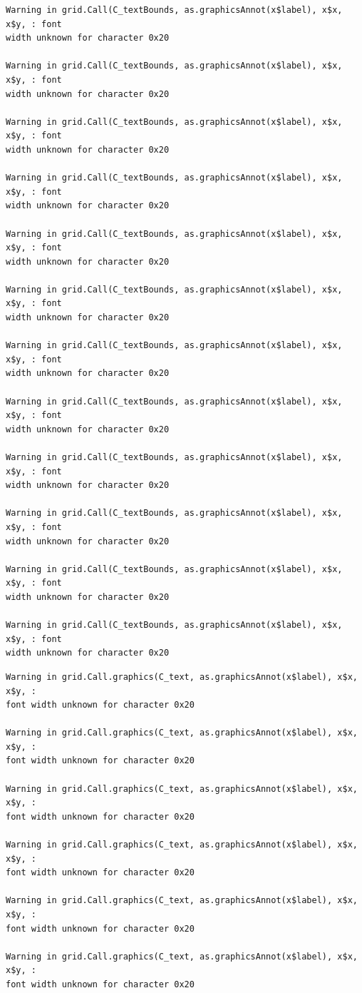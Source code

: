\documentclass[
  letterpaper,
  DIV=11,
  numbers=noendperiod,
  oneside]{scrartcl}
\begin{document}
\begin{verbatim}
Warning in grid.Call(C_textBounds, as.graphicsAnnot(x$label), x$x, x$y, : font
width unknown for character 0x20

Warning in grid.Call(C_textBounds, as.graphicsAnnot(x$label), x$x, x$y, : font
width unknown for character 0x20

Warning in grid.Call(C_textBounds, as.graphicsAnnot(x$label), x$x, x$y, : font
width unknown for character 0x20

Warning in grid.Call(C_textBounds, as.graphicsAnnot(x$label), x$x, x$y, : font
width unknown for character 0x20

Warning in grid.Call(C_textBounds, as.graphicsAnnot(x$label), x$x, x$y, : font
width unknown for character 0x20

Warning in grid.Call(C_textBounds, as.graphicsAnnot(x$label), x$x, x$y, : font
width unknown for character 0x20

Warning in grid.Call(C_textBounds, as.graphicsAnnot(x$label), x$x, x$y, : font
width unknown for character 0x20

Warning in grid.Call(C_textBounds, as.graphicsAnnot(x$label), x$x, x$y, : font
width unknown for character 0x20

Warning in grid.Call(C_textBounds, as.graphicsAnnot(x$label), x$x, x$y, : font
width unknown for character 0x20

Warning in grid.Call(C_textBounds, as.graphicsAnnot(x$label), x$x, x$y, : font
width unknown for character 0x20

Warning in grid.Call(C_textBounds, as.graphicsAnnot(x$label), x$x, x$y, : font
width unknown for character 0x20

Warning in grid.Call(C_textBounds, as.graphicsAnnot(x$label), x$x, x$y, : font
width unknown for character 0x20
\end{verbatim}

\begin{verbatim}
Warning in grid.Call.graphics(C_text, as.graphicsAnnot(x$label), x$x, x$y, :
font width unknown for character 0x20

Warning in grid.Call.graphics(C_text, as.graphicsAnnot(x$label), x$x, x$y, :
font width unknown for character 0x20

Warning in grid.Call.graphics(C_text, as.graphicsAnnot(x$label), x$x, x$y, :
font width unknown for character 0x20

Warning in grid.Call.graphics(C_text, as.graphicsAnnot(x$label), x$x, x$y, :
font width unknown for character 0x20

Warning in grid.Call.graphics(C_text, as.graphicsAnnot(x$label), x$x, x$y, :
font width unknown for character 0x20

Warning in grid.Call.graphics(C_text, as.graphicsAnnot(x$label), x$x, x$y, :
font width unknown for character 0x20
\end{verbatim}
\end{document}
